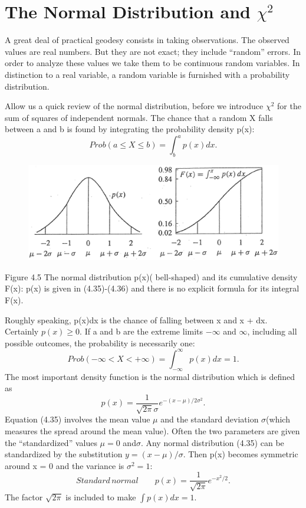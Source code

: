 \section{The Normal Distribution and $\chi^{2}$}
A great deal of practical geodesy consists in taking observations. The observed values are
real numbers. But they are not exact; they include “random” errors. In order to analyze
these values we take them to be continuous random variables. In distinction to a real
variable, a random variable is furnished with a probability distribution.

Allow us a quick review of the normal distribution, before we introduce $\chi^2$ for the
sum of squares of independent normals. The chance that a random X falls between a and b
is found by integrating the probability density p(x):
\begin{equation}
Prob(a\leq X \leq b) = \int^a_bp(x)dx.
\end{equation} 
\begin{figure}[h]
	\centering
	\includegraphics[width=0.7\linewidth]{TeX_files/Part02/chapter04/image/4-5}
	\caption{}
	\label{fig:4-5}
\end{figure}
Figure 4.5\; The normal distribution p(x)( bell-shaped) and its cumulative density F(x):
p(x) is given in (4.35)-(4.36) and there is no explicit formula for its integral F(x).

Roughly speaking, p(x)dx is the chance of falling between x and x + dx. Certainly
$p(x)\geq0$. If a and b are the extreme limits $-\infty$ and $\infty$, including all possible outcomes, the probability is necessarily one: 
\begin{equation}
Prob(-\infty < X < +\infty) = \int^{\infty}_{-\infty}p(x)dx=1.
\end{equation}
The most important density function is the normal distribution which is defined as
\begin{equation}
p(x)=\frac{1}{\sqrt{2\pi}\sigma}e^{-(x-\mu)/2\sigma^{2}}.
\end{equation}
Equation (4.35) involves the mean value $\mu$ and the standard deviation $\sigma$(which measures
the spread around the mean value). Often the two parameters are given the “standardized”
values $\mu=0$ and$\sigma$. Any normal distribution (4.35) can be standardized by the substitution $y=(x-\mu)/\sigma$. Then p(x) becomes symmetric around x = 0 and the variance is
$\sigma^2=1$:
\begin{equation}
Standard\, normal \qquad p(x)=\frac{1}{\sqrt{2\pi}}e^{-x^2/2}.
\end{equation}
The factor $\sqrt{2\pi}$ is included to make $\int p(x)dx=1$.
 
